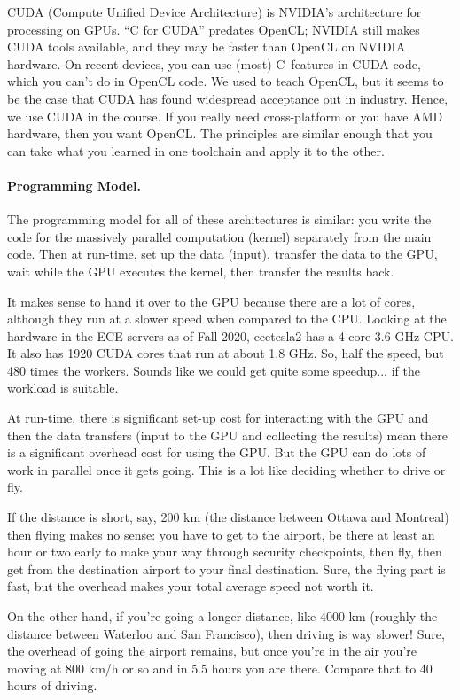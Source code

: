 \documentclass[a4paper]{report}
\newcommand{\CPP}{C\nolinebreak\hspace{-.05em}\raisebox{.4ex}{\tiny\bf +}\nolinebreak\hspace{-.10em}\raisebox{.4ex}{\tiny\bf +}}
\def\CPP{{C\nolinebreak[4]\hspace{-.05em}\raisebox{.4ex}{\tiny\bf ++}}}
\begin{document}
CUDA (Compute Unified Device Architecture) is NVIDIA's architecture
for processing on GPUs. ``C for CUDA'' predates OpenCL; NVIDIA still
makes CUDA tools available, and they may be faster than OpenCL on NVIDIA
hardware. On recent devices, you can use (most) \CPP~features in CUDA code,
which you can't do in OpenCL code. We used to teach OpenCL, but it seems
to be the case that CUDA has found widespread acceptance out in industry.
Hence, we use CUDA in the course. If you really need cross-platform or 
you have AMD hardware, then you want OpenCL. The principles are similar 
enough that you can take what you learned in one toolchain and apply it 
to the other.

\paragraph{Programming Model.} The programming
model for all of these architectures is similar: you write the code for
the massively parallel computation (kernel) separately from the main
code. Then at run-time, set up the data (input), transfer the data to the GPU, wait while the GPU executes the kernel, then transfer the results back. 

It makes sense to hand it over to the GPU because there are a lot of cores, although they run at a slower speed when compared to the CPU. Looking at the hardware in the ECE servers as of Fall 2020, ecetesla2 has a 4 core 3.6 GHz CPU. It also has 1920 CUDA cores that run at about 1.8 GHz. So, half the speed, but 480 times the workers. Sounds like we could get quite some speedup... if the workload is suitable.

At run-time, there is significant set-up cost for interacting with the GPU and then the data transfers (input to the GPU and collecting the results) mean there is a significant overhead cost for using the GPU. But the GPU can do lots of work in parallel once it gets going. This is a lot like deciding whether to drive or fly. 

If the distance is short, say, 200 km (the distance between Ottawa and Montreal) then flying makes no sense: you have to get to the airport, be there at least an hour or two early to make your way through security checkpoints, then fly, then get from the destination airport to your final destination. Sure, the flying part is fast, but the overhead makes your total average speed not worth it.

On the other hand, if you're going a longer distance, like 4000 km (roughly the distance between Waterloo and San Francisco), then driving is way slower! Sure, the overhead of going the airport remains, but once you're in the air you're moving at 800 km/h or so and in 5.5 hours you are there. Compare that to 40 hours of driving.
\end{document}
